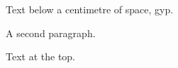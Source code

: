 \documentclass{article}
\begin{document}
\noindent
\begin{minipage}[t]{0.4\linewidth}
  \vspace*{1cm}
  Text below a centimetre of space, gyp.

  \vspace*{5pt}

  A second paragraph.
\end{minipage}\hfill
\begin{minipage}[t]{0.4\linewidth}
  Text at the top.
\end{minipage}
\end{document}
